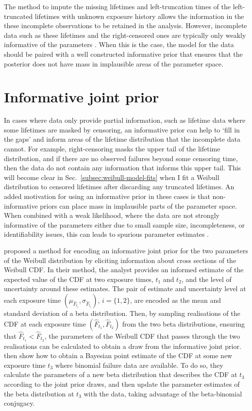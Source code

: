 The method to impute the missing lifetimes and left-truncation times of the left-truncated lifetimes with unknown exposure history allows the information in the these incomplete observations to be retained in the analysis. However, incomplete data such as these lifetimes and the right-censored ones are typically only weakly informative of the parameters \citep{tian2024}. When this is the case, the model for the data should be paired with a well constructed informative prior that ensures that the posterior does not have mass in implausible areas of the parameter space. 

\section{Informative joint prior} \label{sec:weibull-joint-prior}

In cases where data only provide partial information, such as lifetime data where some lifetimes are masked by censoring, an informative prior can help to `fill in the gaps' and inform areas of the lifetime distribution that the incomplete data cannot. For example, right-censoring masks the upper tail of the lifetime distribution, and if there are no observed failures beyond some censoring time, then the data do not contain any information that informs this upper tail. This will become clear in Sec.~\ref{subsec:weibull-model-fits} when I fit a Weibull distribution to censored lifetimes after discarding any truncated lifetimes. An added motivation for using an informative prior in these cases is that non-informative priors can place mass in implausible parts of the parameter space. When combined with a weak likelihood, where the data are not strongly informative of the parameters either due to small sample size, incompleteness, or identifiability issues, this can leads to spurious parameter estimates \citep{tian2024}.

\citet{kaminskiy2005} proposed a method for encoding an informative joint prior for the two parameters of the Weibull distribution by eliciting information about cross sections of the Weibull CDF. In their method, the analyst provides an informed estimate of the expected value of the CDF at two exposure times, $t_1$ and $t_2$, and the level of uncertainty around these estimates. The pair of estimate and uncertainty level at each exposure time $(\mu_{\hat{F}_{t_i}}, \sigma_{\hat{F}_{t_i}})$, $i = \{1, 2\}$, are encoded as the mean and standard deviation of a beta distribution. Then, by sampling realisations of the CDF at each exposure time $(\hat{F}_{t_1}, \hat{F}_{t_2})$ from the two beta distributions, ensuring that $\hat{F}_{t_1} < \hat{F}_{t_2}$, the parameters of the Weibull CDF that passes through the two realisations can be calculated to obtain a draw from the informative joint prior. \citet{kaminskiy2005} then show how to obtain a Bayesian point estimate of the CDF at some new exposure time $t_3$ where binomial failure data are available. To do so, they calculate the parameters of a new beta distribution that describes the CDF at $t_3$ according to the joint prior draws, and then update the parameter estimates of the beta distribution at $t_3$ with the data, taking advantage of the beta-binomial conjugacy.

